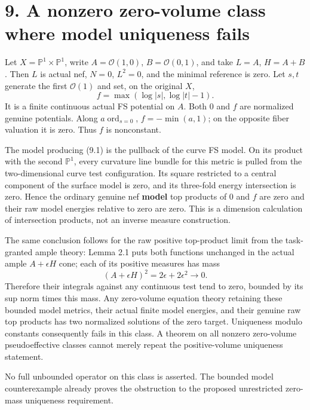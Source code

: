 \documentclass[
  10pt,
]{article}
\begin{document}
\section{9. A nonzero zero-volume class where model uniqueness
fails}\label{a-nonzero-zero-volume-class-where-model-uniqueness-fails}

Let \(X=\mathbb P^1\times\mathbb P^1\), write \(A=\mathcal O(1,0)\),
\(B=\mathcal O(0,1)\), and take \(L=A\), \(H=A+B\). Then \(L\) is actual
nef, \(N=0\), \(L^2=0\), and the minimal reference is zero. Let \(s,t\)
generate the first \(\mathcal O(1)\) and set, on the original \(X\), \[
 f=\max(\log|s|,\log|t|-1).
                                                               \tag{9.1}
\] It is a finite continuous actual FS potential on \(A\). Both \(0\)
and \(f\) are normalized genuine potentials. Along
\(a\operatorname{ord}_{s=0}\), \(f=-\min(a,1)\); on the opposite fiber
valuation it is zero. Thus \(f\) is nonconstant.

The model producing (9.1) is the pullback of the curve FS model. On its
product with the second \(\mathbb P^1\), every curvature line bundle for
this metric is pulled from the two-dimensional curve test configuration.
Its square restricted to a central component of the surface model is
zero, and its three-fold energy intersection is zero. Hence the ordinary
genuine nef \textbf{model} top products of \(0\) and \(f\) are zero and
their raw model energies relative to zero are zero. This is a dimension
calculation of intersection products, not an inverse measure
construction.

The same conclusion follows for the raw positive top-product limit from
the task-granted ample theory: Lemma 2.1 puts both functions unchanged
in the actual ample \(A+\epsilon H\) cone; each of its positive measures
has mass \[
 (A+\epsilon H)^2=2\epsilon+2\epsilon^2\longrightarrow0.
\] Therefore their integrals against any continuous test tend to zero,
bounded by its sup norm times this mass. Any zero-volume equation theory
retaining these bounded model metrics, their actual finite model
energies, and their genuine raw top products has two normalized
solutions of the zero target. Uniqueness modulo constants consequently
fails in this class. A theorem on all nonzero zero-volume
pseudoeffective classes cannot merely repeat the positive-volume
uniqueness statement.

No full unbounded operator on this class is asserted. The bounded model
counterexample already proves the obstruction to the proposed
unrestricted zero-mass uniqueness requirement.
\end{document}

